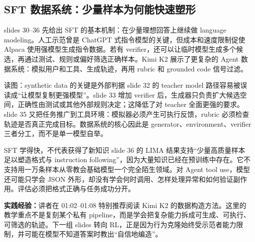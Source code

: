 \subsection{SFT 数据系统：少量样本为何能快速塑形}

slides 30--36 先给出 SFT 的基本机制：在少量理想回答上继续做 language modeling。人工示范曾是 ChatGPT 式指令模型的关键，但成本和速度限制促使 Alpaca 使用强模型生成指令数据。若有 verifier，还可以让临时模型生成多个候选，再通过测试、规则或偏好筛选正确样本。Kimi K2 展示了更复杂的 Agent 数据系统：模拟用户和工具、生成轨迹，再用 rubric 和 grounded code 信号过滤。


\begin{knowledgebox}{读图：synthetic data 的关键是外部判据}
slide 32 的 teacher model 路径容易被误读成“让模型复制更强模型”。slide 33 增加 verifier 后，生成器只负责扩大候选空间，正确性由测试或其他外部规则决定；这降低了对 teacher 全面更强的要求。slide 35 又把任务推广到工具环境：模拟器必须产生可执行反馈，rubric 必须检查轨迹是否真正完成目标。数据系统的核心因此是 generator、environment、verifier 三者分工，而不是单一模型自举。
\end{knowledgebox}

\begin{warningbox}{SFT 学得快，不代表获得了新知识}
slide 36 的 LIMA 结果支持“少量高质量样本足以塑造格式与 instruction following”，因为大量知识已经在预训练中存在。它不支持用一万条样本从零教会基础模型一个完全陌生领域。对 Agent tool use，模型还可能只学会 JSON 外形，却没有学会何时调用、怎样处理异常和如何验证副作用。评估必须把格式正确与任务成功分开。
\end{warningbox}

\textbf{实践经验：}讲者在 01:02--01:08 特别推荐阅读 Kimi K2 的数据构造方法。这里的教学重点不是复刻某个私有 pipeline，而是学会把复杂能力拆成可生成、可执行、可筛选的轨迹。下一组 slides 转向 RL，正是因为行为克隆始终受示范者能力限制，并可能在模型不知道答案时教出“自信地编造”。

